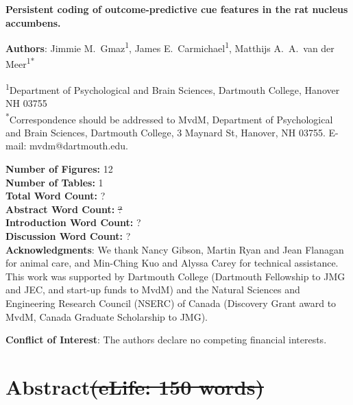 \documentclass[11pt]{article}
\providecommand{\DIFadd}[1]{{\protect\color{blue}\uwave{#1}}} %
\providecommand{\DIFdel}[1]{{\protect\color{red}\sout{#1}}}                      %
\providecommand{\DIFaddbegin}{} %
\providecommand{\DIFaddend}{} %
\providecommand{\DIFdelbegin}{} %
\providecommand{\DIFdelend}{} %
\newcommand{\DIFscaledelfig}{0.5}
\newlength{\DIFdelgraphicswidth} %
\newlength{\DIFdelgraphicsheight} %
\newcommand{\DIFaddincludegraphics}[2][]{{\color{blue}\fbox{\DIFOincludegraphics[#1]{#2}}}} %
\newcommand{\DIFdelincludegraphics}[2][]{%
\sbox{\DIFdelgraphicsbox}{\DIFOincludegraphics[#1]{#2}}%
\settoboxwidth{\DIFdelgraphicswidth}{\DIFdelgraphicsbox} %
\settoboxtotalheight{\DIFdelgraphicsheight}{\DIFdelgraphicsbox} %
\scalebox{\DIFscaledelfig}{%
\parbox[b]{\DIFdelgraphicswidth}{\usebox{\DIFdelgraphicsbox}\\[-\baselineskip] \rule{\DIFdelgraphicswidth}{0em}}\llap{\resizebox{\DIFdelgraphicswidth}{\DIFdelgraphicsheight}{%
\setlength{\unitlength}{\DIFdelgraphicswidth}%
\begin{picture}(1,1)%
\thicklines\linethickness{2pt} %
{\color[rgb]{1,0,0}\put(0,0){\framebox(1,1){}}}%
{\color[rgb]{1,0,0}\put(0,0){\line( 1,1){1}}}%
{\color[rgb]{1,0,0}\put(0,1){\line(1,-1){1}}}%
\end{picture}%
}\hspace*{3pt}}} %
} %
\DeclareRobustCommand{\DIFaddbegin}{\DIFOaddbegin \let\includegraphics\DIFaddincludegraphics} %
\DeclareRobustCommand{\DIFaddend}{\DIFOaddend \let\includegraphics\DIFOincludegraphics} %
\DeclareRobustCommand{\DIFdelbegin}{\DIFOdelbegin \let\includegraphics\DIFdelincludegraphics} %
\DeclareRobustCommand{\DIFdelend}{\DIFOaddend \let\includegraphics\DIFOincludegraphics} %
\begin{document}
\DIFaddbegin \renewcommand{\BBAB}{\BBAA}
\DIFaddend 

{\Large\bf Persistent coding of outcome-predictive cue features in the
  rat nucleus accumbens.}

{\bf Authors}: Jimmie M.\ Gmaz\textsuperscript{1}, James
E.\ Carmichael\textsuperscript{1}, Matthijs A.\ A.\ van der
Meer\textsuperscript{1*}

\textsuperscript{1}Department of Psychological and Brain Sciences,
Dartmouth College, Hanover NH
03755\\ 

\textsuperscript{*}Correspondence should be addressed to MvdM,
Department of Psychological and Brain Sciences, Dartmouth College, 3
Maynard St, Hanover, NH 03755. E-mail: {\sffamily mvdm@dartmouth.edu}.

\textbf{Number of Figures:} 12\\
\textbf{Number of Tables:} 1\\
\textbf{Total Word Count:} ?\\
\textbf{Abstract Word Count:} \DIFdelbegin \DIFdel{?}\DIFdelend \DIFaddbegin \DIFadd{150}\DIFaddend \\
\textbf{Introduction Word Count:} ?\\
\textbf{Discussion Word Count:} ?\\

\textbf{Acknowledgments}: We thank Nancy Gibson, Martin Ryan and Jean
Flanagan for animal care, and Min-Ching Kuo and
Alyssa Carey for technical assistance. This work was supported by
Dartmouth College (Dartmouth Fellowship to JMG and JEC, and start-up funds to
MvdM) and the Natural Sciences and Engineering Research Council
(NSERC) of Canada (Discovery Grant award to MvdM, Canada Graduate
Scholarship to JMG).

\textbf{Conflict of Interest}: The authors declare no competing
financial interests.\\

\newpage
\linenumbers

\section*{Abstract\DIFdelbegin \DIFdel{(eLife: 150 words)}\DIFdelend }
\end{document}

